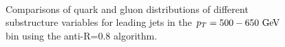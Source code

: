 \begin{figure}
\begin{center}
\\
\caption{Comparisons of quark and gluon distributions of different substructure variables for leading jets in the 
$\pt=500-650 \GeV$ bin using the anti-\kT R=0.8 algorithm. }
\label{fig:qg_pt500_subst_AKt_R08}
\end{center}
\end{figure}

